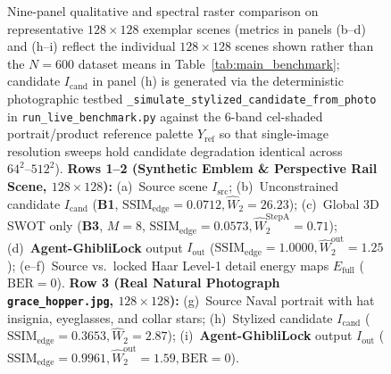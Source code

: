 \documentclass[conference,10pt]{IEEEtran}
\begin{document}
\begin{figure}[t!]
{{{%
}%
}%
}
\caption{Nine-panel qualitative and spectral raster comparison on representative $128\times 128$ exemplar scenes (metrics in panels (b--d) and (h--i) reflect the individual $128\times 128$ scenes shown rather than the $N=600$ dataset means in Table~\ref{tab:main_benchmark}; candidate $I_{\text{cand}}$ in panel (h) is generated via the deterministic photographic testbed \texttt{\_simulate\_stylized\_candidate\_from\_photo} in \texttt{run\_live\_benchmark.py} against the 6-band cel-shaded portrait/product reference palette $Y_{\text{ref}}$ so that single-image resolution sweeps hold candidate degradation identical across $64^2\text{--}512^2$). \textbf{Rows 1--2 (Synthetic Emblem \& Perspective Rail Scene, $128\times 128$):} (a)~Source scene $I_{\text{src}}$; (b)~Unconstrained candidate $I_{\text{cand}}$ (\textbf{B1}, $\mathrm{SSIM}_{\text{edge}}=0.0712, \widehat{W}_2=26.23$); (c)~Global 3D SWOT only (\textbf{B3}, $M=8$, $\mathrm{SSIM}_{\text{edge}}=0.0573, \widehat{W}_2^{\text{StepA}}=0.71$); (d)~\textbf{Agent-GhibliLock} output $I_{\text{out}}$ ($\mathrm{SSIM}_{\text{edge}}=1.0000, \widehat{W}_2^{\text{out}}=1.25$); (e--f)~Source vs.\ locked Haar Level-1 detail energy maps $E_{\text{full}}$ ($\mathrm{BER}=0$). \textbf{Row 3 (Real Natural Photograph \texttt{grace\_hopper.jpg}, $128\times 128$):} (g)~Source Naval portrait with hat insignia, eyeglasses, and collar stars; (h)~Stylized candidate $I_{\text{cand}}$ ($\mathrm{SSIM}_{\text{edge}}=0.3653, \widehat{W}_2=2.87$); (i)~\textbf{Agent-GhibliLock} output $I_{\text{out}}$ ($\mathrm{SSIM}_{\text{edge}}=0.9961, \widehat{W}_2^{\text{out}}=1.59, \mathrm{BER}=0$).}
\label{fig:qualitative}
\end{figure}
\end{document}
